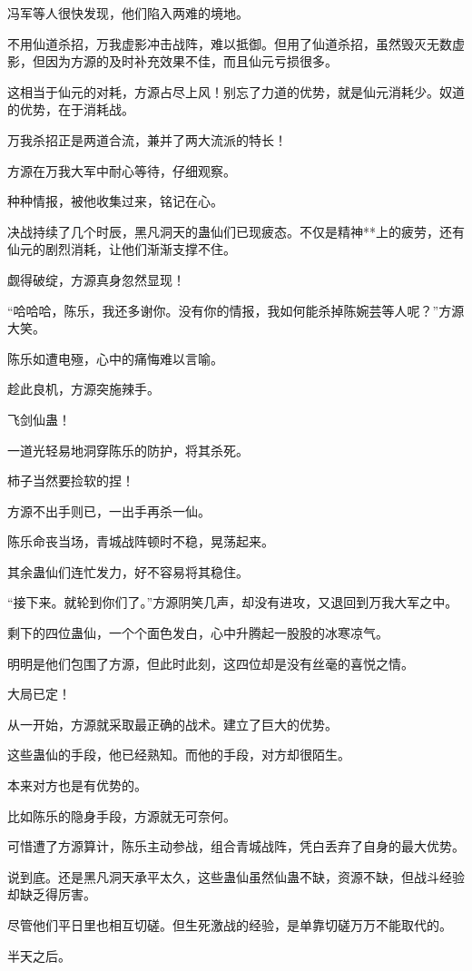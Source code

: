 \begin{this_body}
冯军等人很快发现，他们陷入两难的境地。

不用仙道杀招，万我虚影冲击战阵，难以抵御。但用了仙道杀招，虽然毁灭无数虚影，但因为方源的及时补充效果不佳，而且仙元亏损很多。

这相当于仙元的对耗，方源占尽上风！别忘了力道的优势，就是仙元消耗少。奴道的优势，在于消耗战。

万我杀招正是两道合流，兼并了两大流派的特长！

方源在万我大军中耐心等待，仔细观察。

种种情报，被他收集过来，铭记在心。

决战持续了几个时辰，黑凡洞天的蛊仙们已现疲态。不仅是精神**上的疲劳，还有仙元的剧烈消耗，让他们渐渐支撑不住。

觑得破绽，方源真身忽然显现！

“哈哈哈，陈乐，我还多谢你。没有你的情报，我如何能杀掉陈婉芸等人呢？”方源大笑。

陈乐如遭电殛，心中的痛悔难以言喻。

趁此良机，方源突施辣手。

飞剑仙蛊！

一道光轻易地洞穿陈乐的防护，将其杀死。

柿子当然要捡软的捏！

方源不出手则已，一出手再杀一仙。

陈乐命丧当场，青城战阵顿时不稳，晃荡起来。

其余蛊仙们连忙发力，好不容易将其稳住。

“接下来。就轮到你们了。”方源阴笑几声，却没有进攻，又退回到万我大军之中。

剩下的四位蛊仙，一个个面色发白，心中升腾起一股股的冰寒凉气。

明明是他们包围了方源，但此时此刻，这四位却是没有丝毫的喜悦之情。

大局已定！

从一开始，方源就采取最正确的战术。建立了巨大的优势。

这些蛊仙的手段，他已经熟知。而他的手段，对方却很陌生。

本来对方也是有优势的。

比如陈乐的隐身手段，方源就无可奈何。

可惜遭了方源算计，陈乐主动参战，组合青城战阵，凭白丢弃了自身的最大优势。

说到底。还是黑凡洞天承平太久，这些蛊仙虽然仙蛊不缺，资源不缺，但战斗经验却缺乏得厉害。

尽管他们平日里也相互切磋。但生死激战的经验，是单靠切磋万万不能取代的。

半天之后。


\end{this_body}

